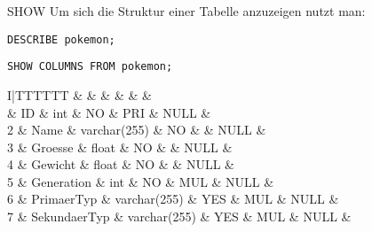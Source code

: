 \begin{sql}{SHOW}
    Um sich die Struktur einer Tabelle anzuzeigen nutzt man:

    \begin{lstlisting}[language=mysql]
        DESCRIBE pokemon; 
    \end{lstlisting}

    \begin{lstlisting}[language=mysql]
        SHOW COLUMNS FROM pokemon; 
    \end{lstlisting}

    \setcounter{rownum}{0}
    \begin{tabular}{I|TTTTTT}
          &  &  &  &  &  &  \\ & ID                        & int                      & NO                       & PRI                     & NULL                        &                           \\
        2 & Name                      & varchar(255)             & NO                       &                         & NULL                        &                           \\
        3 & Groesse                   & float                    & NO                       &                         & NULL                        &                           \\
        4 & Gewicht                   & float                    & NO                       &                         & NULL                        &                           \\
        5 & Generation                & int                      & NO                       & MUL                     & NULL                        &                           \\
        6 & PrimaerTyp                & varchar(255)             & YES                      & MUL                     & NULL                        &                           \\
        7 & SekundaerTyp              & varchar(255)             & YES                      & MUL                     & NULL                        &                           \\
    \end{tabular}
\end{sql}

